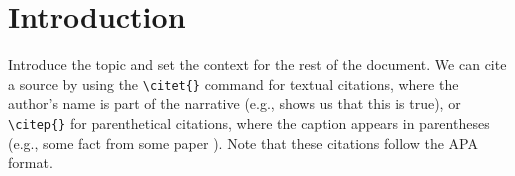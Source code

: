 \section{Introduction}

Introduce the topic and set the context for the rest of the document. We can cite a source by using the \lstinline|\citet{}| command for textual citations, where the author's name is part of the narrative (e.g., \citet{vaswani2017attention} shows us that this is true), or \lstinline|\citep{}| for parenthetical citations, where the caption appears in parentheses (e.g., some fact from some paper \citep{vaswani2017attention}). Note that these citations follow the APA format.
